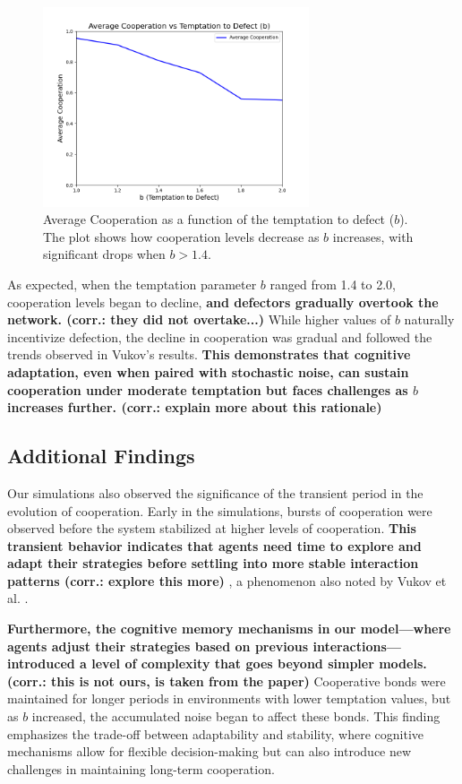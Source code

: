 \documentclass[runningheads]{llncs}
\begin{document}
\begin{figure}[htbp]
    \centering
    \includegraphics[width=0.7\textwidth]{cooperation_vs_b.png}
    \caption{Average Cooperation as a function of the temptation to defect (\( b \)). The plot shows how cooperation levels decrease as \( b \) increases, with significant drops when \( b > 1.4 \).}
    \label{fig:coop_vs_b}
\end{figure}

As expected, when the temptation parameter \( b \) ranged from 1.4 to 2.0, cooperation levels began to decline, \textbf{and defectors gradually overtook the network. (corr.: they did not overtake...)} While higher values of \( b \) naturally incentivize defection, the decline in cooperation was gradual and followed the trends observed in Vukov's results. \textbf{This demonstrates that cognitive adaptation, even when paired with stochastic noise, can sustain cooperation under moderate temptation but faces challenges as \( b \) increases further. (corr.: explain more about this rationale)}

\subsection{Additional Findings}
Our simulations also observed the significance of the transient period in the evolution
of cooperation. Early in the simulations, bursts of cooperation were observed
before the system stabilized at higher levels of cooperation.
\textbf{This transient behavior indicates that agents need time to explore and
adapt their strategies before settling into more stable interaction patterns
(corr.: explore this more)} , a phenomenon also noted by Vukov et al. \cite{vukov}.

\textbf{Furthermore, the cognitive memory mechanisms in our model—where agents adjust their strategies based on previous interactions—introduced a level of complexity that goes beyond simpler models. (corr.: this is not ours, is taken from the paper)}  Cooperative bonds were maintained for longer periods in environments with lower temptation values, but as \( b \) increased, the accumulated noise began to affect these bonds. This finding emphasizes the trade-off between adaptability and stability, where cognitive mechanisms allow for flexible decision-making but can also introduce new challenges in maintaining long-term cooperation.
\end{document}
